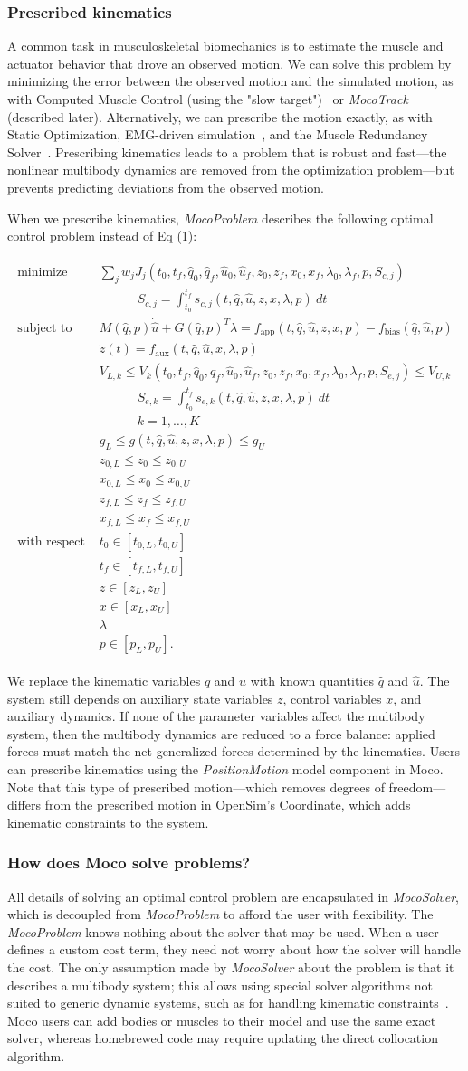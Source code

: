 \documentclass[10pt,letterpaper]{article}
\newcommand{\prescribed}{
\begin{align}
    \begin{aligned}
        \mbox{minimize} \quad & \sum_j w_j J_{j}(t_0, t_f, \hat{q}_0, \hat{q}_f, \hat{u}_0, \hat{u}_f, z_0, z_f, x_{0}, x_{f}, \lambda_0, \lambda_f, p, S_{c,j}) \\
        & \quad\quad\quad S_{c,j} = \int_{t_0}^{t_f} s_{c,j}(t, \hat{q}, \hat{u}, z, x, \lambda, p)~dt \\
        \mbox{subject to} \quad &
         M(\hat{q}, p)\dot{\hat{u}} + G(\hat{q}, p)^T \lambda = f_{\textrm{app}}(t, \hat{q}, \hat{u}, z, x, p) - f_{\textrm{bias}}(\hat{q}, \hat{u}, p) \\
         & \dot{z}(t) = f_{\textrm{aux}}(t, \hat{q}, \hat{u}, x, \lambda, p) \\
         & V_{L,k} \leq V_k(t_0, t_f, \hat{q}_0, \hat{q}_f, \hat{u}_0, \hat{u}_f, z_0, z_f, x_{0}, x_{f}, \lambda_0, \lambda_f, p, S_{e,j}) \leq V_{U,k} \\
        & \quad\quad\quad S_{e,k} = \int_{t_0}^{t_f} s_{e,k}(t, \hat{q}, \hat{u}, z, x, \lambda, p)~dt \\
         & \quad\quad\quad k = 1, \ldots, K \\
        & g_{L} \leq g(t, \hat{q}, \hat{u}, z, x, \lambda, p) \leq g_{U} \\
         & z_{0,L} \leq z_0 \leq z_{0,U} \\
         & x_{0,L} \leq x_0 \leq x_{0,U} \\
         & z_{f,L} \leq z_f \leq z_{f,U} \\
         & x_{f,L} \leq x_f \leq x_{f,U} \\
         \mbox{with respect to} \quad
         & t_0 \in [t_{0,L}, t_{0,U}] \\
         & t_f \in [t_{f,L}, t_{f,U}] \\
         & z \in [z_{L}, z_{U}] \\
         & x \in [x_{L}, x_{U}] \\
         & \lambda \\
         & p \in [p_{L}, p_{U}].
    \end{aligned}
\end{align}
}
\begin{document}
\subsubsection*{Prescribed kinematics}

A common task in musculoskeletal biomechanics is to estimate the muscle and actuator behavior that drove an observed motion. We can solve this problem by minimizing the error between the observed motion and the simulated motion, as with Computed Muscle Control (using the "slow target")~\cite{Thelen:2003bba} or \textit{MocoTrack} (described later). Alternatively, we can prescribe the motion exactly, as with Static Optimization, EMG-driven simulation~\cite{Lloyd:2003}, and the Muscle Redundancy Solver~\cite{Groote:2016dq}. Prescribing kinematics leads to a problem that is robust and fast---the nonlinear multibody dynamics are removed from the optimization problem---but prevents predicting deviations from the observed motion.

When we prescribe kinematics, \textit{MocoProblem} describes the following optimal control problem instead of Eq (1):

\prescribed

We replace the kinematic variables $q$ and $u$ with known quantities $\hat{q}$ and $\hat{u}$. The system still depends on auxiliary state variables $z$, control variables $x$, and auxiliary dynamics. If none of the parameter variables affect the multibody system, then the multibody dynamics are reduced to a force balance: applied forces must match the net generalized forces determined by the kinematics. Users can prescribe kinematics using the \textit{PositionMotion} model component in Moco. Note that this type of prescribed motion---which removes degrees of freedom---differs from the prescribed motion in OpenSim’s Coordinate, which adds kinematic constraints to the system.

\subsubsection*{How does Moco solve problems?}

All details of solving an optimal control problem are encapsulated in \textit{MocoSolver}, which is decoupled from \textit{MocoProblem} to afford the user with flexibility. The \textit{MocoProblem} knows nothing about the solver that may be used. When a user defines a custom cost term, they need not worry about how the solver will handle the cost. The only assumption made by \textit{MocoSolver} about the problem is that it describes a multibody system; this allows using special solver algorithms not suited to generic dynamic systems, such as for handling kinematic constraints~\cite{Posa:2016}. Moco users can add bodies or muscles to their model and use the same exact solver, whereas homebrewed code may require updating the direct collocation algorithm.
\end{document}
